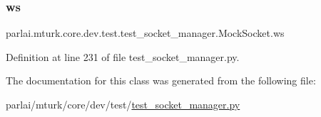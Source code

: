 \subsubsection{\texorpdfstring{ws}{ws}}
{\footnotesize\ttfamily parlai.\+mturk.\+core.\+dev.\+test.\+test\+\_\+socket\+\_\+manager.\+Mock\+Socket.\+ws}



Definition at line 231 of file test\+\_\+socket\+\_\+manager.\+py.



The documentation for this class was generated from the following file\+:\begin{DoxyCompactItemize}
\item 
parlai/mturk/core/dev/test/\hyperlink{dev_2test_2test__socket__manager_8py}{test\+\_\+socket\+\_\+manager.\+py}\end{DoxyCompactItemize}
